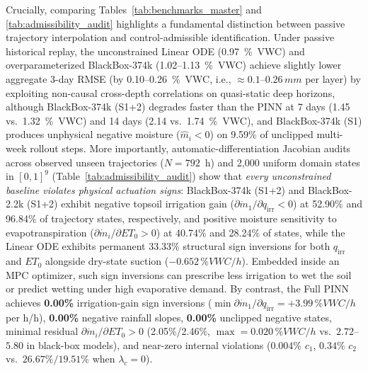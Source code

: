 \documentclass[pdflatex,sn-nature]{sn-jnl}%
\theoremstyle{thmstyleone}%
\theoremstyle{thmstyletwo}%
\theoremstyle{thmstylethree}%
\begin{document}
Crucially, comparing Tables~\ref{tab:benchmarks_master} and \ref{tab:admissibility_audit} highlights a fundamental distinction between passive trajectory interpolation and control-admissible identification. Under passive historical replay, the unconstrained Linear ODE (0.97~\si{\%VWC}) and overparameterized BlackBox-374k (1.02--1.13~\si{\%VWC}) achieve slightly lower aggregate 3-day RMSE (by 0.10--0.26~\si{\%VWC}, i.e., $\approx 0.1$--$0.26\,\si{mm}$ per layer) by exploiting non-causal cross-depth correlations on quasi-static deep horizons, although BlackBox-374k (S1+2) degrades faster than the PINN at 7 days (1.45 vs.\ 1.32~\si{\%VWC}) and 14 days (2.14 vs.\ 1.74~\si{\%VWC}), and BlackBox-374k (S1) produces unphysical negative moisture ($\hat{m}_i < 0$) on 9.59\% of unclipped multi-week rollout steps. More importantly, automatic-differentiation Jacobian audits across observed unseen trajectories ($N = 792$~h) and 2,000 uniform domain states in $[0,1]^9$ (Table~\ref{tab:admissibility_audit}) show that \emph{every unconstrained baseline violates physical actuation signs}: BlackBox-374k (S1+2) and BlackBox-2.2k (S1+2) exhibit negative topsoil irrigation gain ($\partial \dot{m}_1/\partial q_{\mathrm{irr}} < 0$) at 52.90\% and 96.84\% of trajectory states, respectively, and positive moisture sensitivity to evapotranspiration ($\partial \dot{m}_i/\partial ET_0 > 0$) at 40.74\% and 28.24\% of states, while the Linear ODE exhibits permanent 33.33\% structural sign inversions for both $q_{\mathrm{irr}}$ and $ET_0$ alongside dry-state suction ($-0.652\,\si{\%VWC/h}$). Embedded inside an MPC optimizer, such sign inversions can prescribe less irrigation to wet the soil or predict wetting under high evaporative demand. By contrast, the Full PINN achieves \textbf{0.00\%} irrigation-gain sign inversions ($\min \partial \dot{m}_1/\partial q_{\mathrm{irr}} = +3.99\,\si{\%VWC/h}$ per \si{h/h}), \textbf{0.00\%} negative rainfall slopes, \textbf{0.00\%} unclipped negative states, minimal residual $\partial \dot{m}_i/\partial ET_0 > 0$ (2.05\%/2.46\%, $\max = 0.020\,\si{\%VWC/h}$ vs.\ $2.72$--$5.80$ in black-box models), and near-zero internal violations ($0.004\%$ $c_1$, $0.34\%$ $c_2$ vs.\ $26.67\% / 19.51\%$ when $\lambda_c=0$).
\end{document}
